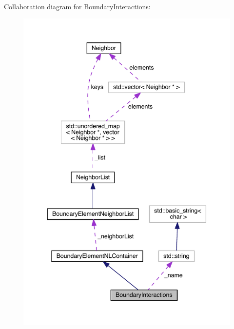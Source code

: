 Collaboration diagram for Boundary\+Interactions\+:\nopagebreak
\begin{figure}[H]
\begin{center}
\leavevmode
\includegraphics[width=344pt]{classBoundaryInteractions__coll__graph}
\end{center}
\end{figure}
